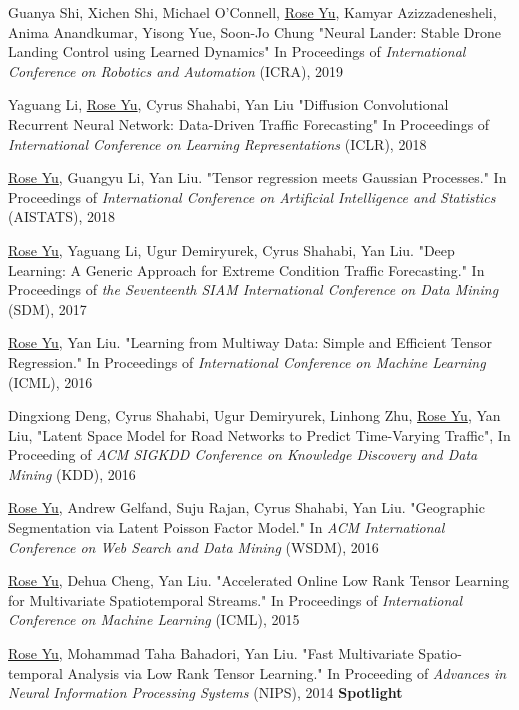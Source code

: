 \documentclass[margin,line]{res}
\begin{document}
\begin{resume}
\begin{enumerate}[label={[C\arabic*]}]
\item Guanya Shi, Xichen Shi, Michael O'Connell, \underline{Rose Yu}, Kamyar Azizzadenesheli, Anima Anandkumar, Yisong Yue, Soon-Jo Chung
       "Neural Lander: Stable Drone Landing Control using Learned Dynamics" In  Proceedings  of \textit{ International Conference on Robotics and Automation} (ICRA), 2019

\item 	Yaguang Li,  \underline{Rose Yu}, Cyrus Shahabi, Yan Liu
	"Diffusion Convolutional Recurrent Neural Network: Data-Driven Traffic Forecasting" In  Proceedings  of   \textit{International Conference on Learning Representations
	}(ICLR), 2018 
	
\item  \underline{Rose Yu}, Guangyu Li, Yan Liu. "Tensor regression meets Gaussian Processes." In Proceedings  of   \textit{International Conference on Artificial Intelligence and Statistics} (AISTATS), 2018 

\item \underline{Rose Yu}, Yaguang Li, Ugur Demiryurek, Cyrus Shahabi, Yan Liu. "Deep Learning: A Generic Approach for Extreme Condition Traffic Forecasting." In   Proceedings  of  \textit{the Seventeenth SIAM International Conference on Data Mining }(SDM), 2017

\item \underline{Rose Yu}, Yan Liu. "Learning from Multiway Data: Simple and Efficient Tensor Regression." In Proceedings  of  \textit{International Conference on Machine Learning }(ICML),   2016

\item Dingxiong Deng, Cyrus Shahabi, Ugur Demiryurek, Linhong Zhu,  \underline{Rose Yu}, Yan Liu, 
"Latent Space Model for Road Networks to Predict Time-Varying Traffic", In Proceeding of  \textit{ACM SIGKDD Conference on Knowledge Discovery and Data Mining } (KDD), 2016


\item \underline{Rose Yu}, Andrew Gelfand, Suju Rajan, Cyrus Shahabi, Yan Liu. "Geographic Segmentation via Latent Poisson Factor Model." In \textit{ACM International Conference on Web Search and Data Mining} (WSDM), 2016 

\item \underline{Rose Yu}, Dehua Cheng, Yan Liu. "Accelerated Online Low Rank Tensor Learning for Multivariate Spatiotemporal Streams." In Proceedings  of  \textit{International Conference on Machine Learning} (ICML), 2015

\item \underline{Rose Yu}, Mohammad Taha Bahadori, Yan Liu. "Fast Multivariate Spatio-temporal Analysis via Low Rank Tensor Learning." In Proceeding of  \textit{Advances in Neural Information Processing Systems} (NIPS), 2014 \textbf{Spotlight}


\end{enumerate}
\end{resume}
\end{document}

